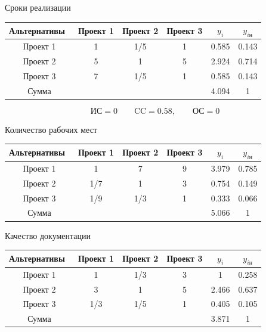 \documentclass[unicode,11pt,notheorems,xcolor=table]{beamer}
\begin{document}
\begin{frame}{Сроки реализации}
    \begin{tabular}{c|ccc|cc}
    \hline
        Альтернативы & Проект 1 & Проект 2 & Проект 3 & $y_i$ & $y_{i\text{н}}$\\
    \hline
        Проект 1 & 1 & 1/5 & 1 & 0.585 & 0.143\\
        Проект 2 & 5 & 1  & 5 & 2.924 & 0.714\\
        Проект 3 & 7 & 1/5  & 1 & 0.585 & 0.143\\
    \hline
        Сумма & & & & 4.094 & 1\\
    \hline
    \end{tabular}
    $$
    \text{ИС}=0\qquad \text{CC}= 0.58,\qquad \text{ОС}=0
    $$
\end{frame}
\begin{frame}{Количество рабочих мест}
    \begin{tabular}{c|ccc|cc}
    \hline
        Альтернативы & Проект 1 & Проект 2 & Проект 3 & $y_i$ & $y_{i\text{н}}$\\
    \hline
        Проект 1 & 1 & 7 & 9 & 3.979 & 0.785\\
        Проект 2 & 1/7 & 1  & 3 & 0.754 & 0.149\\
        Проект 3 & 1/9 & 1/3  & 1 & 0.333 & 0.066\\
    \hline
        Сумма & & & & 5.066 & 1\\
    \hline
    \end{tabular}
\end{frame}
\begin{frame}{Качество документации}
    \begin{tabular}{c|ccc|cc}
    \hline
        Альтернативы & Проект 1 & Проект 2 & Проект 3 & $y_i$ & $y_{i\text{н}}$\\
    \hline
        Проект 1 & 1 & 1/3 & 3 & 1 & 0.258\\
        Проект 2 & 3 & 1  & 5 & 2.466 & 0.637\\
        Проект 3 & 1/3 & 1/5  & 1 & 0.405 & 0.105\\
    \hline
        Сумма & & & & 3.871 & 1\\
    \hline
    \end{tabular}
\end{frame}
\end{document}
